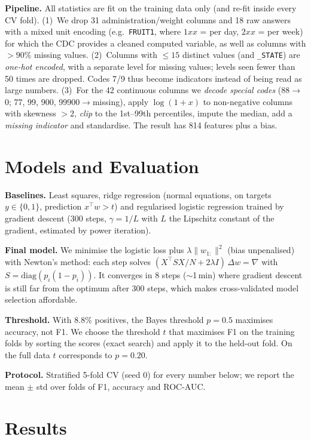 \documentclass[10pt,conference,compsocconf]{IEEEtran}
\begin{document}
\textbf{Pipeline.} All statistics are fit on the training data only (and
re-fit inside every CV fold).
(1)~We drop 31 administration/weight columns and 18 raw answers with a
mixed unit encoding (e.g.\ \texttt{FRUIT1}, where $1xx$ = per day, $2xx$ =
per week) for which the CDC provides a cleaned computed variable, as well as
columns with $>90\%$ missing values.
(2)~Columns with $\le 15$ distinct values (and \texttt{\_STATE}) are
\emph{one-hot encoded}, with a separate level for missing values; levels
seen fewer than 50 times are dropped. Codes 7/9 thus become indicators
instead of being read as large numbers.
(3)~For the 42 continuous columns we \emph{decode special codes}
(88$\to$0; 77, 99, 900, 99900$\to$missing), apply $\log(1+x)$ to
non-negative columns with skewness $>2$, \emph{clip} to the 1st--99th
percentiles, impute the median, add a \emph{missing indicator} and
standardise. The result has 814 features plus a bias.

\section{Models and Evaluation}
\textbf{Baselines.} Least squares, ridge regression (normal equations, on
targets $y\in\{0,1\}$, prediction $x^\top w>t$) and regularised logistic
regression trained by gradient descent (300 steps, $\gamma=1/L$ with $L$
the Lipschitz constant of the gradient, estimated by power iteration).

\textbf{Final model.} We minimise the logistic loss plus
$\lambda\|w_{1:}\|^2$ (bias unpenalised) with Newton's method: each step
solves $(X^\top S X/N + 2\lambda I)\,\Delta w=\nabla$ with
$S=\mathrm{diag}(p_i(1-p_i))$. It converges in 8 steps ($\sim$1\,min)
where gradient descent is still far from the optimum after 300 steps, which
makes cross-validated model selection affordable.

\textbf{Threshold.} With $8.8\%$ positives, the Bayes threshold $p=0.5$
maximises accuracy, not F1. We choose the threshold $t$ that maximises F1 on
the training folds by sorting the scores (exact search) and apply it to the
held-out fold. On the full data $t$ corresponds to $p=0.20$.

\textbf{Protocol.} Stratified 5-fold CV (seed 0) for every number below; we
report the mean $\pm$ std over folds of F1, accuracy and ROC-AUC.

\section{Results}
\end{document}
